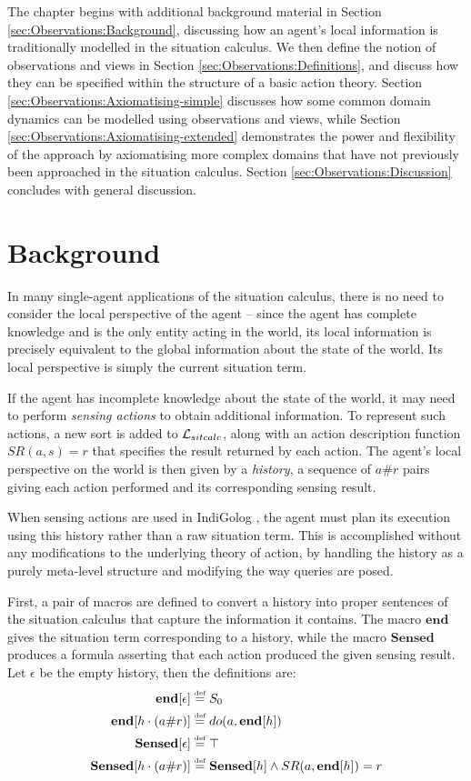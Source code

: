 The chapter begins with additional background material in Section
\ref{sec:Observations:Background}, discussing how an agent's local
information is traditionally modelled in the situation calculus. We
then define the notion of observations and views in Section \ref{sec:Observations:Definitions},
and discuss how they can be specified within the structure of a basic
action theory. Section \ref{sec:Observations:Axiomatising-simple}
discusses how some common domain dynamics can be modelled using observations
and views, while Section \ref{sec:Observations:Axiomatising-extended}
demonstrates the power and flexibility of the approach by axiomatising
more complex domains that have not previously been approached in the
situation calculus. Section \ref{sec:Observations:Discussion} concludes
with general discussion.


\section{Background\label{sec:Observations:Background}}

In many single-agent applications of the situation calculus, there
is no need to consider the local perspective of the agent -- since
the agent has complete knowledge and is the only entity acting in
the world, its local information is precisely equivalent to the global
information about the state of the world. Its local perspective is
simply the current situation term.

If the agent has incomplete knowledge about the state of the world,
it may need to perform \emph{sensing actions} to obtain additional
information. To represent such actions, a new sort is
added to $\mathcal{L}_{sitcalc}$, along with an action description function $SR(a,s)=r$
that specifies the result returned by each action. The agent's local
perspective on the world is then given by a \emph{history}, a sequence
of $a\#r$ pairs giving each action performed and its corresponding
sensing result.

When sensing actions are used in IndiGolog \citep{giacomo99indigolog},
the agent must plan its execution using this history rather than a
raw situation term. This is accomplished without any modifications
to the underlying theory of action, by handling the history as a purely
meta-level structure and modifying the way queries are posed.

First, a pair of macros are defined to convert a history into proper
sentences of the situation calculus that capture the information it
contains. The macro $\mathbf{end}$ gives the situation term corresponding
to a history, while the macro $\mathbf{Sensed}$ produces a formula
asserting that each action produced the given sensing result. Let
$\epsilon$ be the empty history, then the definitions are:\begin{alignat*}{1}
\mathbf{end}[\epsilon] & \stackrel{\mbox{\tiny def}}{=} S_{0}\\
\mathbf{end}[h\cdot(a\#r)] & \stackrel{\mbox{\tiny def}}{=} do(a,\mathbf{end}[h])\\
\mathbf{Sensed}[\epsilon] & \stackrel{\mbox{\tiny def}}{=}\top\\
\mathbf{Sensed}[h\cdot(a\#r)] & \stackrel{\mbox{\tiny def}}{=}\mathbf{Sensed}[h]\wedge SR(a,\mathbf{end}[h])=r\end{alignat*}


